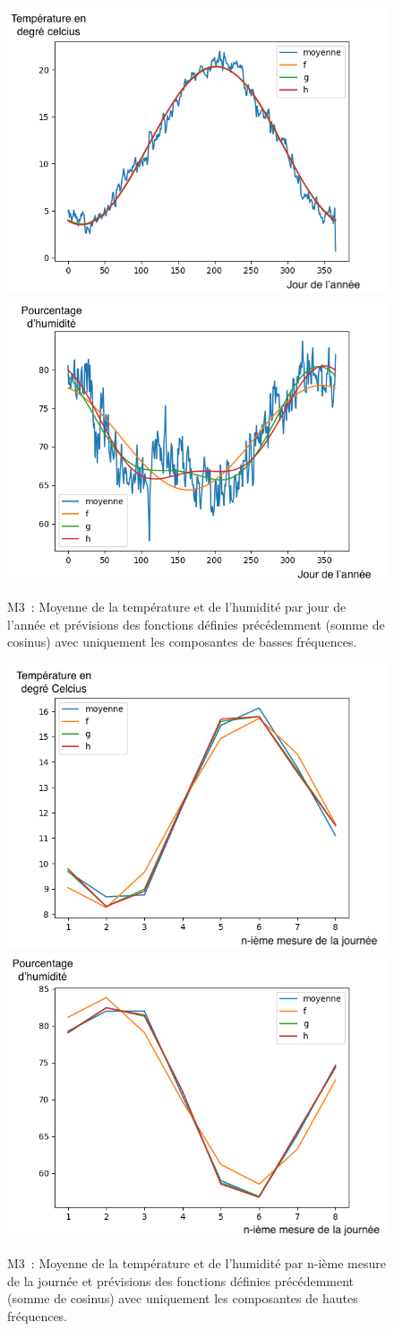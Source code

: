 \documentclass[11pt,a4paper]{article}
\begin{document}
\begin{figure} [H]
\centering
\includegraphics[width=0.48 \textwidth]{./imagesTIPE/CourbeAnneeT.png}\quad
\includegraphics[width=0.48 \textwidth]{./imagesTIPE/CourbeAnneeH.png}
\caption{\label{fig:moyBassesFreq} M3~: Moyenne de la température et de l'humidité par jour de l'année et prévisions des fonctions définies précédemment (somme de cosinus) avec uniquement les composantes de basses fréquences.}
\end{figure}
\begin{figure} [H]
\centering
\includegraphics[width=0.48 \textwidth]{./imagesTIPE/CourbeJourneeT.png}\quad
\includegraphics[width=0.48 \textwidth]{./imagesTIPE/CourbeJourneeH.png}
\caption{\label{fig:moyHautesFreq} M3~: Moyenne de la température et de l'humidité par n-ième mesure de la journée et prévisions des fonctions définies précédemment (somme de cosinus) avec uniquement les composantes de hautes fréquences.}
\end{figure}
\end{document}
